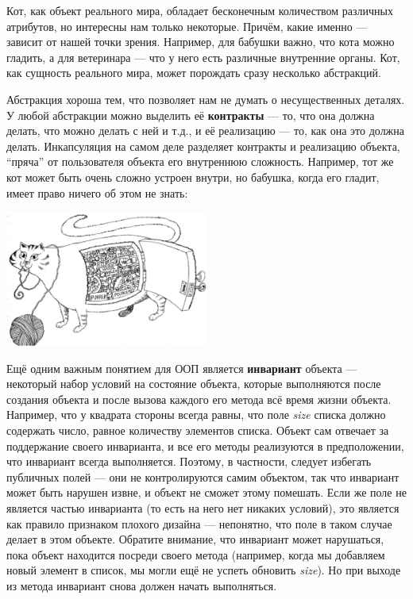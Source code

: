 \documentclass[a5paper]{article}
\begin{document}
Кот, как объект реального мира, обладает бесконечным количеством различных атрибутов, но интересны нам только некоторые. Причём, какие именно --- зависит от нашей точки зрения. Например, для бабушки важно, что кота можно гладить, а для ветеринара --- что у него есть различные внутренние органы. Кот, как сущность реального мира, может порождать сразу несколько абстракций.

Абстракция хороша тем, что позволяет нам не думать о несущественных деталях. У любой абстракции можно выделить её \textbf{контракты} --- то, что она должна делать, что можно делать с ней и т.д., и её реализацию --- то, как она это должна делать. Инкапсуляция на самом деле разделяет контракты и реализацию объекта, ``пряча'' от пользователя объекта его внутреннюю сложность. Например, тот же кот может быть очень сложно устроен внутри, но бабушка, когда его гладит, имеет право ничего об этом не знать:

\begin{center}
	\includegraphics[width=0.5\textwidth]{incapsulation.png}
\end{center}

Ещё одним важным понятием для ООП является \textbf{инвариант} объекта --- некоторый набор условий на состояние объекта, которые выполняются после создания объекта и после вызова каждого его метода всё время жизни объекта. Например, что у квадрата стороны всегда равны, что поле \textit{size} списка должно содержать число, равное количеству элементов списка. Объект сам отвечает за поддержание своего инварианта, и все его методы реализуются в предположении, что инвариант всегда выполняется. Поэтому, в частности, следует избегать публичных полей --- они не контролируются самим объектом, так что инвариант может быть нарушен извне, и объект не сможет этому помешать. Если же поле не является частью инварианта (то есть на него нет никаких условий), это является как правило признаком плохого дизайна --- непонятно, что поле в таком случае делает в этом объекте. Обратите внимание, что инвариант может нарушаться, пока объект находится посреди своего метода (например, когда мы добавляем новый элемент в список, мы могли ещё не успеть обновить \textit{size}). Но при выходе из метода инвариант снова должен начать выполняться.
\end{document}
